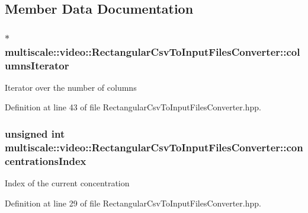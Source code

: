 \subsection{\-Member \-Data \-Documentation}
\hypertarget{classmultiscale_1_1video_1_1RectangularCsvToInputFilesConverter_aeeee251d65b8c189a72d08f3c70a94be}{
\subsubsection[{columns\-Iterator}]{$\ast$ {\bf multiscale\-::video\-::\-Rectangular\-Csv\-To\-Input\-Files\-Converter\-::columns\-Iterator}}}\label{classmultiscale_1_1video_1_1RectangularCsvToInputFilesConverter_aeeee251d65b8c189a72d08f3c70a94be}
\-Iterator over the number of columns 

\-Definition at line 43 of file \-Rectangular\-Csv\-To\-Input\-Files\-Converter.\-hpp.

\hypertarget{classmultiscale_1_1video_1_1RectangularCsvToInputFilesConverter_a48b31e858d0ebac757af77703202634f}{
\subsubsection[{concentrations\-Index}]{\setlength{\rightskip}{0pt plus 5cm}unsigned int {\bf multiscale\-::video\-::\-Rectangular\-Csv\-To\-Input\-Files\-Converter\-::concentrations\-Index}}}\label{classmultiscale_1_1video_1_1RectangularCsvToInputFilesConverter_a48b31e858d0ebac757af77703202634f}
\-Index of the current concentration 

\-Definition at line 29 of file \-Rectangular\-Csv\-To\-Input\-Files\-Converter.\-hpp.

